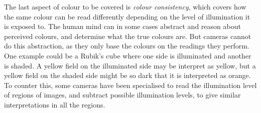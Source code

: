 The last aspect of colour to be covered is \textit{colour consistency}, which covers how the same colour can be read differently depending on the level of illumination it is exposed to. The human mind can in some cases abstract and reason about perceived colours, and determine what the true colours are. But cameras cannot do this abstraction, as they only base the colours on the readings they perform. One example could be a Rubik's cube where one side is illuminated and another is shaded. A yellow field on the illuminated side may be interpret as yellow, but a yellow field on the shaded side might be so dark that it is interpreted as orange. To counter this, some cameras have been specialised to read the illumination level of regions of images, and subtract possible illumination levels, to give similar interpretations in all the regions.